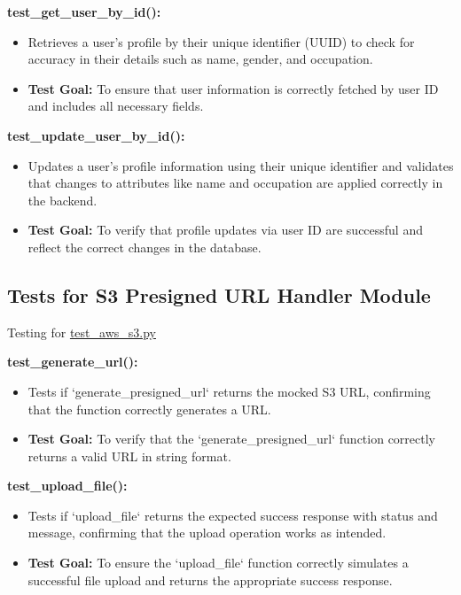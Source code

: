 \documentclass[12pt, titlepage]{article}
\begin{document}
\begin{enumerate}
\begin{enumerate}
\begin{enumerate}
\begin{enumerate}
\textbf{test\_get\_user\_by\_id():}  
\begin{itemize}
    \item Retrieves a user’s profile by their unique identifier (UUID) to check for accuracy in their details such as name, gender, and occupation.
    \item \textbf{Test Goal:} To ensure that user information is correctly fetched by user ID and includes all necessary fields. 
    \newline
\end{itemize}

\textbf{test\_update\_user\_by\_id():}  
\begin{itemize}
    \item Updates a user’s profile information using their unique identifier and validates that changes to attributes like name and occupation are applied correctly in the backend.
    \item \textbf{Test Goal:} To verify that profile updates via user ID are successful and reflect the correct changes in the database. 
    \newline
\end{itemize}


\subsection{Tests for S3 Presigned URL Handler Module}
Testing for \href{https://github.com/RezaJodeiri/CXR-Capstone/blob/main/src/backend/test/test_aws_s3.py}{test\_aws\_s3.py}

\textbf{test\_generate\_url():}  
\begin{itemize}
    \item Tests if `generate\_presigned\_url` returns the mocked S3 URL, confirming that the function correctly generates a URL.
    \item \textbf{Test Goal:} To verify that the `generate\_presigned\_url` function correctly returns a valid URL in string format.
    \newline
    \newline
\end{itemize}

\textbf{test\_upload\_file():}  
\begin{itemize}
    \item Tests if `upload\_file` returns the expected success response with status and message, confirming that the upload operation works as intended.
    \item \textbf{Test Goal:} To ensure the `upload\_file` function correctly simulates a successful file upload and returns the appropriate success response.
    \newline
\end{itemize}



\end{enumerate}
\end{enumerate}
\end{enumerate}
\end{enumerate}
\end{document}
